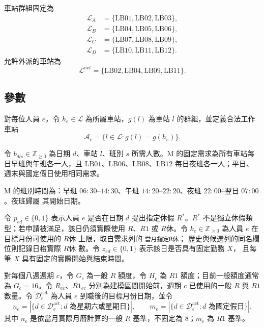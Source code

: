 \documentclass[a4paper,12pt]{article}
\begin{document}
車站群組固定為
\[
  \begin{aligned}
    \mathcal{L}_{A}&=\{\mathrm{LB01},\mathrm{LB02},\mathrm{LB03}\},\\
    \mathcal{L}_{B}&=\{\mathrm{LB04},\mathrm{LB05},\mathrm{LB06}\},\\
    \mathcal{L}_{C}&=\{\mathrm{LB07},\mathrm{LB08},\mathrm{LB09}\},\\
    \mathcal{L}_{D}&=\{\mathrm{LB10},\mathrm{LB11},\mathrm{LB12}\}.
  \end{aligned}
\]
允許外派的車站為
\[
  \mathcal{L}^{ext}=\{\mathrm{LB02},\mathrm{LB04},\mathrm{LB09},\mathrm{LB11}\}.
\]

\subsection{參數}

對每位人員 \(e\)，令 \(h_e\in\mathcal{L}\) 為所屬車站，\(g(l)\) 為車站
\(l\) 的群組，並定義合法工作車站
\[
  \mathcal{A}_e
  =
  \{l\in\mathcal{L}:g(l)=g(h_e)\}.
\]

令 \(b_{dls}\in\mathbb{Z}_{\geq0}\) 為日期 \(d\)、車站 \(l\)、班別 \(s\)
所需人數。M 的固定需求為所有車站每日早班與午班各一人，且
\(\mathrm{LB01}\)、\(\mathrm{LB06}\)、\(\mathrm{LB08}\)、\(\mathrm{LB12}\)
每日夜班各一人；平日、週末與國定假日使用相同需求。

M 的班別時間為：早班 \(06{:}30\)--\(14{:}30\)、午班
\(14{:}20\)--\(22{:}20\)、夜班 \(22{:}00\)--翌日 \(07{:}00\)。夜班歸屬
其開始日期。

令 \(p_{ed}\in\{0,1\}\) 表示人員 \(e\) 是否在日期 \(d\) 提出指定休假
\(R^*\)。\(R^*\) 不是獨立休假類型；若申請被滿足，該日仍須實際使用
\(R\)、\(R1\) 或 \(R休\)。令 \(k_e\in\mathbb{Z}_{\geq0}\) 為人員 \(e\)
在目標月份可使用的 \(R休\) 上限，取自需求列的 \texttt{當月指定R休}；
歷史與候選列的同名欄位則記錄日格實際 \(R休\) 數。令 \(z_{ed}\in\{0,1\}\) 表示該日是否具有固定勤務 \(X\)，
且每筆 \(X\) 具有固定的實際開始與結束時間。

對每個八週週期 \(c\)，令 \(G_c\) 為一般 \(R\) 額度，令 \(H_c\) 為 \(R1\)
額度；目前一般額度通常為 \(G_c=16\)。令
\(\overline{R}_{ec}\)、\(\overline{R1}_{ec}\) 分別為建模區間開始前，週期
\(c\) 已使用的一般 \(R\) 與 \(R1\) 數量。令 \(\mathcal D^{\mathrm{act}}_e\)
為人員 \(e\) 到職後的目標月份日期，並令
\[
  n_e=\left|\{d\in\mathcal D^{\mathrm{act}}_e:d\text{ 為星期六或星期日}\}\right|,
  \qquad
  m_e=\left|\{d\in\mathcal D^{\mathrm{act}}_e:d\text{ 為國定假日}\}\right|.
\]
其中 \(n_e\) 是依當月實際月曆計算的一般 \(R\) 基準，不固定為 8；\(m_e\)
為 \(R1\) 基準。
\end{document}
